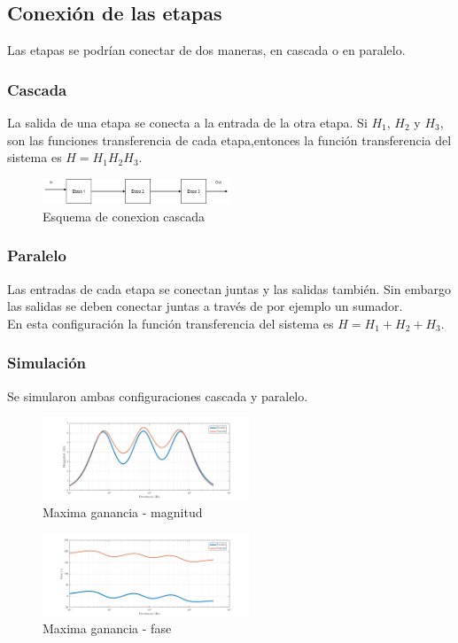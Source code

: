 \documentclass[../../tc_tp3_main.tex]{subfiles}
\begin{document}
\subsection{Conexión de las etapas}
Las etapas se podrían conectar de dos maneras, en cascada o en paralelo.
\subsubsection{Cascada}
La salida de una etapa se conecta a la entrada de la otra etapa. Si $H_1$, $H_2$ y $H_3$, son las funciones transferencia de cada etapa,entonces  la función transferencia del sistema es $H=H_1 H_2 H_3$.

\begin{figure}[H]
\centering
\includegraphics[width=0.5\textwidth]{imagenes/cascada.png}
\caption{Esquema de conexion cascada} 
\end{figure}

\subsubsection{Paralelo}
Las entradas de cada etapa se conectan juntas y las salidas también. Sin embargo las salidas se deben conectar juntas a través de por ejemplo un sumador.
\\En esta configuración la función transferencia del sistema es $H=H_1+ H_2+ H_3$.




\subsubsection{Simulación}
Se simularon ambas configuraciones cascada y paralelo.

\begin{figure}[H]
\centering
\includegraphics[width=0.55\textwidth]{imagenes/parCasSimMax_m.png}
\caption{Maxima ganancia - magnitud} 
\end{figure}

\begin{figure}[H]
\centering
\includegraphics[width=0.55\textwidth]{imagenes/parCasSimMax_f.png}
\caption{Maxima ganancia - fase} 
\end{figure}
\end{document}
